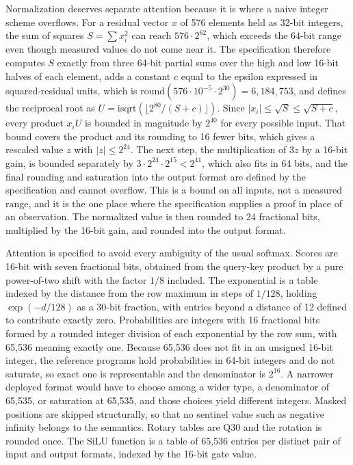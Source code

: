 \documentclass[11pt]{article}
\begin{document}
Normalization deserves separate attention because it is where a naive integer scheme overflows. For a residual vector $x$ of 576 elements held as 32-bit integers, the sum of squares $S=\sum x_i^2$ can reach $576\cdot 2^{62}$, which exceeds the 64-bit range even though measured values do not come near it. The specification therefore computes $S$ exactly from three 64-bit partial sums over the high and low 16-bit halves of each element, adds a constant $c$ equal to the epsilon expressed in squared-residual units, which is $\mathrm{round}(576\cdot10^{-5}\cdot2^{30})=6{,}184{,}753$, and defines the reciprocal root as $U=\mathrm{isqrt}\left(\lfloor 2^{80}/(S+c)\rfloor\right)$. Since $|x_i|\le\sqrt{S}\le\sqrt{S+c}$, every product $x_iU$ is bounded in magnitude by $2^{40}$ for every possible input. That bound covers the product and its rounding to 16 fewer bits, which gives a rescaled value $z$ with $|z|\le2^{24}$. The next step, the multiplication of $3z$ by a 16-bit gain, is bounded separately by $3\cdot2^{24}\cdot2^{15}<2^{41}$, which also fits in 64 bits, and the final rounding and saturation into the output format are defined by the specification and cannot overflow. This is a bound on all inputs, not a measured range, and it is the one place where the specification supplies a proof in place of an observation. The normalized value is then rounded to 24 fractional bits, multiplied by the 16-bit gain, and rounded into the output format.

Attention is specified to avoid every ambiguity of the usual softmax. Scores are 16-bit with seven fractional bits, obtained from the query-key product by a pure power-of-two shift with the factor $1/8$ included. The exponential is a table indexed by the distance from the row maximum in steps of $1/128$, holding $\exp(-d/128)$ as a 30-bit fraction, with entries beyond a distance of 12 defined to contribute exactly zero. Probabilities are integers with 16 fractional bits formed by a rounded integer division of each exponential by the row sum, with 65,536 meaning exactly one. Because 65,536 does not fit in an unsigned 16-bit integer, the reference programs hold probabilities in 64-bit integers and do not saturate, so exact one is representable and the denominator is $2^{16}$. A narrower deployed format would have to choose among a wider type, a denominator of 65,535, or saturation at 65,535, and those choices yield different integers. Masked positions are skipped structurally, so that no sentinel value such as negative infinity belongs to the semantics. Rotary tables are $\mathrm{Q}30$ and the rotation is rounded once. The SiLU function is a table of 65,536 entries per distinct pair of input and output formats, indexed by the 16-bit gate value.
\end{document}
